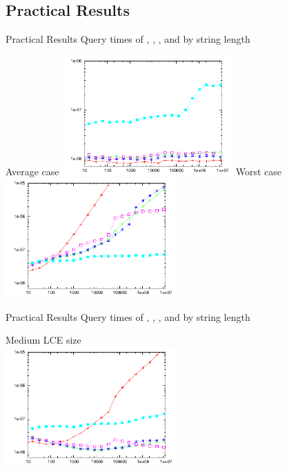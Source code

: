\documentclass{beamer}
\begin{document}
\subsection{Practical Results}
\begin{frame}{Practical Results}
    Query times of
    \textcolor{red}{},
    \textcolor{green}{\fprint[2]},
    \textcolor{blue}{\fprint[3]},
    \textcolor{magenta}{\fprint[\logceil]} and
    \textcolor{cyan}{}
    by string length
    \begin{multicols}{2}{
        \begin{center}
            Average case
            \includegraphics[width=0.49\textwidth,type=pdf,ext=.pdf,read=.pdf]{../src/results/length-slides-cache-rand10.plt}
            \newpage
            Worst case
            \includegraphics[width=0.49\textwidth,type=pdf,ext=.pdf,read=.pdf]{../src/results/length-slides-cache-alla.plt}
        \end{center}
    }
    \end{multicols}
\end {frame}

\begin{frame}{Practical Results}
    Query times of
    \textcolor{red}{},
    \textcolor{green}{\fprint[2]},
    \textcolor{blue}{\fprint[3]},
    \textcolor{magenta}{\fprint[\logceil]} and
    \textcolor{cyan}{}
    by string length
    \begin{center}
        Medium LCE size\\
        \includegraphics[width=0.49\textwidth,type=pdf,ext=.pdf,read=.pdf]{../src/results/length-slides-cache-repeat-pow.plt}
    \end{center}
\end {frame}
\end{document}
